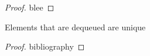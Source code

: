 \documentclass[a4paper,anonymous,USenglish]{lipics-v2021} %
\theoremstyle{definition}
\begin{document}
\begin{proof}
  blee
\end{proof}

\begin{lemma}
  Elements that are dequeued are unique
\end{lemma}

\begin{proof}
  bibliography
\end{proof}



\end{document}
